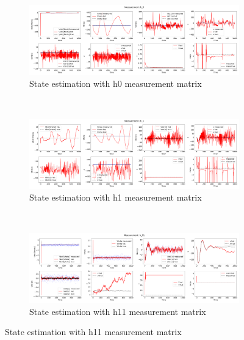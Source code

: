 \documentclass[12pt]{article}
\begin{document}
\begin{figure}[H]
    \begin{subfigure}[t]{\textwidth}
        \centering
        \includegraphics[width=15cm]{figures/ekf_with_noisy_sinusoidal_x_and_h0.png}
        \caption{State estimation with h0 measurement matrix}
        \label{fig:05a}
    \end{subfigure}
    \\
    \begin{subfigure}[t]{\textwidth}
        \centering
        \includegraphics[width=15cm]{figures/ekf_with_noisy_sinusoidal_x_and_h1.png}
        \caption{State estimation with h1 measurement matrix}
        \label{fig:05b}
    \end{subfigure}
    \\
    \begin{subfigure}[t]{\textwidth}
        \centering
        \includegraphics[width=15cm]{figures/ekf_with_noisy_sinusoidal_x_and_h11.png}
        \caption{State estimation with h11 measurement matrix}
        \label{fig:05c}
    \end{subfigure}
\end{figure}
\end{document}
